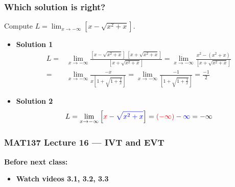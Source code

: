 \documentclass[14pt]{beamer}
\newcommand {\DS} [1] {${\displaystyle #1}$}
\newcommand{\setsize}[1]{\fontsize{#1}{#1}\selectfont} %
\begin{document}
\begin{frame}
\setsize{13}
\frametitle{Which solution is right?}
Compute \DS{L = \lim_{x \to -\infty} \left[  x - \sqrt{x^2+x} \right]}.

\begin{itemize}
	\item {\bf Solution 1}
{\setsize{11}
		\begin{align*}
			L = & \lim_{x\to -\infty} \frac{\left[  x - \sqrt{x^2+x} \right] \; \left[  x + \sqrt{x^2+x} \right]}{\left[  x + \sqrt{x^2+x} \right]}
			= \lim_{x \to -\infty} \frac{x^2-(x^2+x)}{\left[  x + \sqrt{x^2+x} \right]}
				\\
			=& \lim_{x \to -\infty}\frac{-x}{x \left[ 1 + \sqrt{1 + \frac{1}{x}} \right]} 
			= \lim_{x \to -\infty}\frac{-1}{ \left[ 1 + \sqrt{1 + \frac{1}{x}} \right]}
			= \frac{-1}{2}
		\end{align*}	
}
	\item  {\bf Solution 2}
		$$
			L = \lim_{x \to -\infty} \left[ {\color{red} x }- {\color{blue} \sqrt{x^2+x} }\right] = {\color{red}(-\infty)} - {\color{blue}\infty} = - \infty
		$$
\end{itemize}

\end{frame}

\begin{frame}
\frametitle{MAT137 Lecture 16 --- IVT and EVT}
	{\bf Before next class:}
		\begin{itemize} \normalsize
			\item {\bf Watch videos 3.1, 3.2, 3.3 }
		\end{itemize}
	\vfill

\end{frame}
\end{document}
